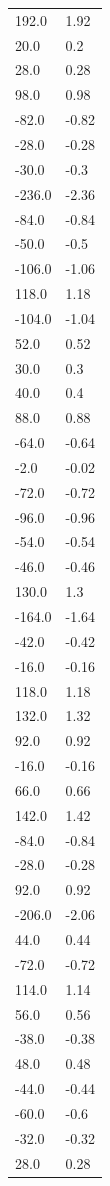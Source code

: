 \begin{longtable}{ll}
192.0 & 1.92 \\
20.0 & 0.2 \\
28.0 & 0.28 \\
98.0 & 0.98 \\
-82.0 & -0.82 \\
-28.0 & -0.28 \\
-30.0 & -0.3 \\
-236.0 & -2.36 \\
-84.0 & -0.84 \\
-50.0 & -0.5 \\
-106.0 & -1.06 \\
118.0 & 1.18 \\
-104.0 & -1.04 \\
52.0 & 0.52 \\
30.0 & 0.3 \\
40.0 & 0.4 \\
88.0 & 0.88 \\
-64.0 & -0.64 \\
-2.0 & -0.02 \\
-72.0 & -0.72 \\
-96.0 & -0.96 \\
-54.0 & -0.54 \\
-46.0 & -0.46 \\
130.0 & 1.3 \\
-164.0 & -1.64 \\
-42.0 & -0.42 \\
-16.0 & -0.16 \\
118.0 & 1.18 \\
132.0 & 1.32 \\
92.0 & 0.92 \\
-16.0 & -0.16 \\
66.0 & 0.66 \\
142.0 & 1.42 \\
-84.0 & -0.84 \\
-28.0 & -0.28 \\
92.0 & 0.92 \\
-206.0 & -2.06 \\
44.0 & 0.44 \\
-72.0 & -0.72 \\
114.0 & 1.14 \\
56.0 & 0.56 \\
-38.0 & -0.38 \\
48.0 & 0.48 \\
-44.0 & -0.44 \\
-60.0 & -0.6 \\
-32.0 & -0.32 \\
28.0 & 0.28 \\

\end{longtable}
